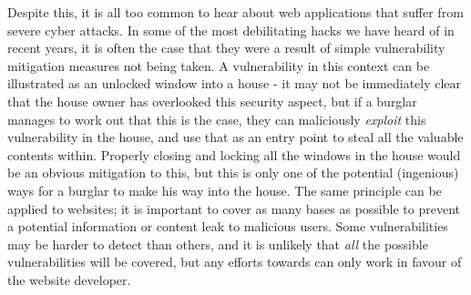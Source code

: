 Despite this, it is all too common to hear about web applications that suffer from severe cyber attacks. In some of the most debilitating hacks we have heard of in recent years, it is often the case that they were a result of simple vulnerability mitigation measures not being taken. A vulnerability in this context can be illustrated as an unlocked window into a house - it may not be immediately clear that the house owner has overlooked this security aspect, but if a burglar manages to work out that this is the case, they can maliciously \textit{exploit} this vulnerability in the house, and use that as an entry point to steal all the valuable contents within. Properly closing and locking all the windows in the house would be an obvious mitigation to this, but this is only one of the potential (ingenious) ways for a burglar to make his way into the house. The same principle can be applied to websites; it is important to cover as many bases as possible to prevent a potential information or content leak to malicious users. Some vulnerabilities may be harder to detect than others, and it is unlikely that \textit{all} the possible vulnerabilities will be covered, but any efforts towards  can only work in favour of the website developer.  \\

